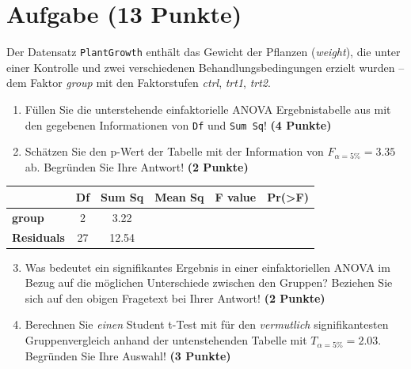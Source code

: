 \documentclass[a4paper, 10pt]{scrartcl}\usepackage[]{graphicx}\usepackage[]{xcolor}
\begin{document}
\section{Aufgabe \hfill (13 Punkte)}


Der Datensatz \texttt{PlantGrowth} enth{\"a}lt das Gewicht der Pflanzen
(\textit{weight}), die unter einer Kontrolle und zwei verschiedenen
Behandlungsbedingungen erzielt wurden -- dem Faktor \textit{group} mit den
Faktorstufen \textit{ctrl}, \textit{trt1}, \textit{trt2}.



\begin{enumerate}
\item F{\"u}llen Sie die unterstehende einfaktorielle ANOVA Ergebnistabelle aus
  mit den gegebenen Informationen von \texttt{Df} und \texttt{Sum Sq}!
  \textbf{(4 Punkte)}
\item Sch{\"a}tzen Sie den p-Wert der Tabelle mit der Information von
  $F_{\alpha = 5\%} = 3.35$ ab. Begr{\"u}nden Sie Ihre
  Antwort! \textbf{(2 Punkte)}
\end{enumerate}

\vspace{1Ex}

\begin{center}
  \Large
  \begin{tabular}{l|c|c|c|c|c}
     & \textbf{Df} & \textbf{Sum Sq} & \textbf{Mean Sq} & \textbf{F value} & \textbf{Pr(>F)} \strut\\
    \hline
   \textbf{group}  & 2 & 3.22 &  &  &  \strut\\
    \hline
   \textbf{Residuals}  & 27 & 12.54 &  &  &  \strut\\
  \end{tabular}
\end{center}

\vspace{1Ex}

\begin{enumerate}
  \setcounter{enumi}{2}
\item Was bedeutet ein signifikantes Ergebnis in einer einfaktoriellen
  ANOVA im Bezug auf die m{\"o}glichen Unterschiede zwischen den Gruppen? Beziehen Sie sich auf den obigen Fragetext bei Ihrer Antwort!
  \textbf{(2 Punkte)}
\item Berechnen Sie \textit{einen} Student t-Test mit f{\"u}r den \textit{vermutlich}
  signifikantesten Gruppenvergleich anhand der untenstehenden Tabelle mit
  $T_{\alpha = 5\%} = 2.03$. Begr{\"u}nden Sie Ihre Auswahl! \textbf{(3 Punkte)}
\end{enumerate}
\end{document}
